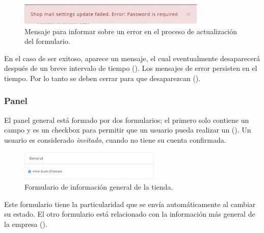 \begin{figure}[H]
	\centering
	\includegraphics[width=0.8\textwidth]{figuras/dashboard/ecommerce/error_message.png}
	\caption{Mensaje para informar sobre un error en el proceso de actualización del formulario.}
	\label{figure:dashboard:ecommerce:error_message}
\end{figure}

En el caso de ser exitoso, aparece un mensaje, el cual eventualmente desaparecerá después de un breve intervalo de tiempo (). Los mensajes de error persisten en el tiempo. Por lo tanto se deben cerrar para que desaparezcan ().


\subsubsection*{Panel \generalPanel}

El panel general está formado por dos formularios; el primero solo contiene un campo y es un checkbox para permitir que un usuario \userGuestAccount pueda realizar un \checkoutCOM (). Un usuario es considerado \textit{invitado}, cuando no tiene su cuenta confirmada.

\begin{figure}[H]
	\centering
	\includegraphics[width=0.6\textwidth]{figuras/dashboard/ecommerce/general_menu/allow_checkout.png}
	\caption{Formulario de información general de la tienda.}
	\label{figure:dashboard:ecommerce:general_menu:allow_checkout}
\end{figure}

Este formulario tiene la particularidad que se envía automáticamente al cambiar su estado.
El otro formulario está relacionado con la información más general de la empresa ().

